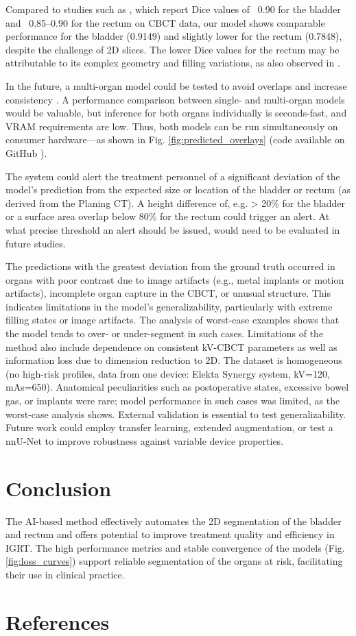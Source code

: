 \documentclass{article}
\begin{document}
Compared to studies such as \citep{radici2024}, which report Dice values of
~0.90 for the bladder and ~0.85–0.90 for the rectum on CBCT data, our model
shows comparable performance for the bladder (0.9149) and slightly lower for
the rectum (0.7848), despite the challenge of 2D slices. The lower Dice values
for the rectum may be attributable to its complex geometry and filling
variations, as also observed in \citep{rayed2024}.

In the future, a multi-organ model could be tested to avoid overlaps and
increase consistency \citep{wasserthal2023}. A performance comparison between
single- and multi-organ models would be valuable, but inference for both organs
individually is seconds-fast, and VRAM requirements are low. Thus, both models
can be run simultaneously on consumer hardware—as shown in Fig.
\ref{fig:predicted_overlays} (code available on GitHub \citep{rhone_repo}).

The system could alert the treatment personnel of a significant deviation of
the model's prediction from the expected size or location of the bladder or
rectum (as derived from the Planing CT). A height difference of, e.g. > 20\%
for the bladder or a surface area overlap below 80\% for the rectum could
trigger an alert. At what precise threshold an alert should be issued, would
need to be evaluated in future studies.

The predictions with the greatest deviation from the ground truth occurred in
organs with poor contrast due to image artifacts (e.g., metal implants or
motion artifacts), incomplete organ capture in the CBCT, or unusual structure.
This indicates limitations in the model’s generalizability, particularly with
extreme filling states or image artifacts. The analysis of worst-case examples
shows that the model tends to over- or under-segment in such cases. Limitations
of the method also include dependence on consistent kV-CBCT parameters as well
as information loss due to dimension reduction to 2D. The dataset is
homogeneous (no high-risk profiles, data from one device: Elekta Synergy
system, kV=120, mAs=650). Anatomical peculiarities such as postoperative
states, excessive bowel gas, or implants were rare; model performance in such
cases was limited, as the worst-case analysis shows. External validation is
essential to test generalizability. Future work could employ transfer learning,
extended augmentation, or test a nnU-Net to improve robustness against variable
device properties.

\section{Conclusion}
The AI-based method effectively automates the 2D segmentation of the bladder and
rectum and offers potential to improve treatment quality and efficiency in
IGRT. The high performance metrics and stable convergence of the models (Fig.
\ref{fig:loss_curves}) support reliable segmentation of the organs at risk,
facilitating their use in clinical practice.

\section{References}
 
 
\end{document}
